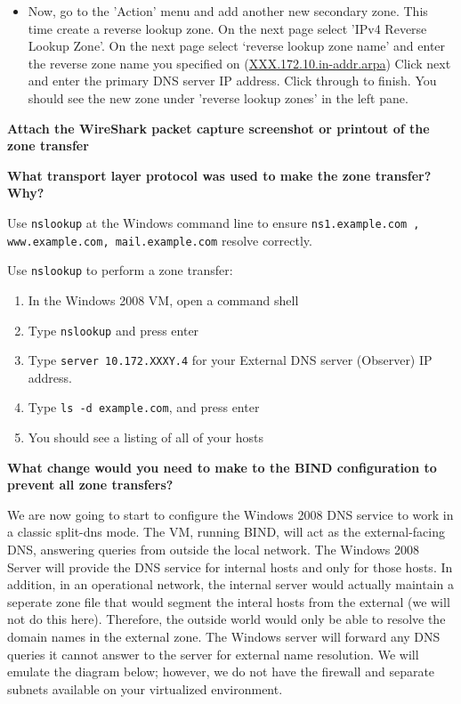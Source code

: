 \documentclass{article}
\begin{document}
\begin{itemize}
\item Now, go to the 'Action' menu and add another new secondary zone. This time create a reverse lookup zone. On the next page select 'IPv4 Reverse Lookup Zone'. On the next page select `reverse lookup zone name' and enter the reverse zone name you specified on \ubuntu (\url{XXX.172.10.in-addr.arpa}) Click next and enter the primary DNS server IP address. Click through to finish. You should see the new zone under 'reverse lookup zones' in the left pane.
\end{itemize}

\textbf{ \question Attach the WireShark packet capture screenshot or printout of the zone transfer}

\textbf{ \question What transport layer protocol was used to make the zone transfer? Why?}

Use {\tt nslookup} at the Windows command line to ensure {\tt ns1.example.com , www.example.com, mail.example.com} resolve correctly.

Use {\tt nslookup} to perform a zone transfer: 
\begin{enumerate}
\item In the Windows 2008 VM, open a command shell
\item Type {\tt nslookup} and press enter
\item Type {\tt server 10.172.XXXY.4} for your External DNS \ubuntu server (Observer) IP address.
\item Type {\tt ls -d example.com}, and press enter
\item You should see a listing of all of your hosts
\end{enumerate}

\textbf{\question  What change would you need to make to the BIND configuration to prevent all zone transfers? }

We are now going to start to configure the Windows 2008 DNS service to work in a classic split-dns mode. The \ubuntu VM, running BIND, will act as the external-facing DNS, answering queries from outside the local network. The Windows 2008 Server will provide the DNS service for internal hosts and only for those hosts. In addition, in an operational network, the internal server would actually maintain a seperate zone file that would segment the interal hosts from the external (we will not do this here).  Therefore, the outside world would only be able to resolve the domain names in the external zone. The Windows server will forward any DNS queries it cannot answer to the \ubuntu server for external name resolution. We will emulate the diagram below; however, we do not have the firewall and separate subnets available on your virtualized environment.
\end{document}
